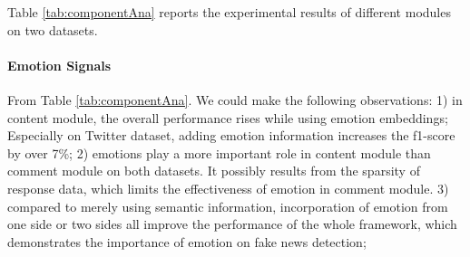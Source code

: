 \documentclass[conference]{IEEEtran}
\begin{document}
	Table \ref{tab:componentAna} reports the experimental results of different modules on two datasets. 
	\paragraph{Emotion Signals} From Table \ref{tab:componentAna}. We could make the following observations: 1) in content module, the overall performance rises while using emotion embeddings;  Especially on Twitter dataset, adding emotion information increases the f1-score by over 7\%; 2) emotions play a more important role in content module than comment module on both datasets. It possibly results from the sparsity of response data, which limits the effectiveness of emotion in comment module. 3) compared to merely using semantic information, incorporation of emotion from one side or two sides all improve the performance of the whole framework, which demonstrates the importance of emotion on fake news detection;
	
\end{document}
